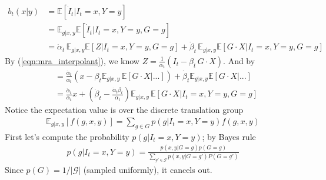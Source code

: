 \documentclass[12pt,fleqn]{article}
\numberwithin{equation}{section}
\begin{document}
\begin{align}
	b_t(x|y) & = \mathbb E[\dot I_t | I_t = x, Y=y]\\
	& = \mathbb E_{g|x,y} \mathbb E[\dot I_t  | I_t = x , Y = y, G=g]\\
	& = \dot \alpha_t \, \mathbb E_{g|x,y} \mathbb E[Z | I_t = x , Y = y, G=g] + \dot \beta_t \, \mathbb E_{g|x,y} \mathbb E[G \cdot X| I_t = x , Y = y, G=g]
\end{align}
By (\ref{eqn:mra_interpolant}), we know $Z = \frac{1}{\alpha_t} (I_t - \beta_t \, G \cdot X)$. And by 
\begin{align}
	& = \frac{\dot \alpha_t}{\alpha_t} (x - \beta_t \mathbb E_{g|x,y} \, \mathbb E[G \cdot X | ...] ) + \dot\beta_t \mathbb E_{g|x,y} \mathbb E[ G \cdot X| ...]\\
	& = \frac{\dot \alpha_t}{\alpha_t} x + \left( \dot \beta_t -\frac{\dot \alpha_t \beta_t}{\alpha_t} \right) \mathbb E_{g|x,y} \, \mathbb E[G \cdot X | I_t = x , Y = y, G=g]
\end{align}
Notice the expectation value is over the discrete translation group
\begin{align}
	\mathbb E_{g|x,y} [f(g,x,y)] = 	\sum_{g \in G} p(g | I_t = x,  Y=y) f(g,x,y)
\end{align}
First let's compute the probability $p(g | I_t = x, Y=y)$; by Bayes rule
\begin{align}
	p(g | I_t=x, Y = y) = \frac{p(x,y | G=g) p(G=g)}{\sum_{g' \in \mathcal G} p(x,y | G=g') P(G=g')}
\end{align}
Since $p(G) = 1/|\mathcal G|$ (sampled uniformly), it cancels out. 
\end{document}

